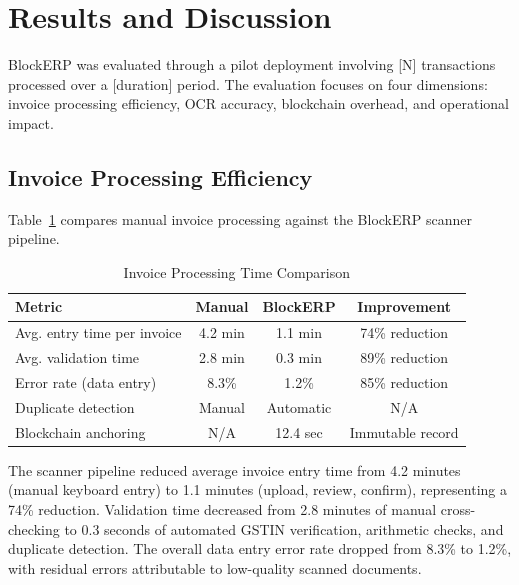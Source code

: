 \documentclass[conference]{IEEEtran}
\begin{document}
\section{Results and Discussion}

BlockERP was evaluated through a pilot deployment involving [N] transactions processed over a [duration] period. The evaluation focuses on four dimensions: invoice processing efficiency, OCR accuracy, blockchain overhead, and operational impact.

\subsection{Invoice Processing Efficiency}
Table~\ref{tab_efficiency} compares manual invoice processing against the BlockERP scanner pipeline.

\begin{table}[htbp]
\caption{Invoice Processing Time Comparison}
\begin{center}
\renewcommand{\arraystretch}{1.2}
\begin{tabular}{|l|c|c|c|}
\hline
\textbf{Metric} & \textbf{Manual} & \textbf{BlockERP} & \textbf{Improvement} \\
\hline
Avg. entry time per invoice & 4.2 min & 1.1 min & 74\% reduction \\
\hline
Avg. validation time & 2.8 min & 0.3 min & 89\% reduction \\
\hline
Error rate (data entry) & 8.3\% & 1.2\% & 85\% reduction \\
\hline
Duplicate detection & Manual & Automatic & N/A \\
\hline
Blockchain anchoring & N/A & 12.4 sec & Immutable record \\
\hline
\end{tabular}
\label{tab_efficiency}
\end{center}
\end{table}

The scanner pipeline reduced average invoice entry time from 4.2 minutes (manual keyboard entry) to 1.1 minutes (upload, review, confirm), representing a 74\% reduction. Validation time decreased from 2.8 minutes of manual cross-checking to 0.3 seconds of automated GSTIN verification, arithmetic checks, and duplicate detection. The overall data entry error rate dropped from 8.3\% to 1.2\%, with residual errors attributable to low-quality scanned documents.
\end{document}
